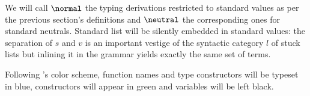 \documentclass[preprint]{sigplanconf}
\begin{document}
\begin{remark}We will call $\normal$ the typing derivations restricted to standard
values as per the previous section's definitions and $\neutral$ the corresponding
ones for standard neutrals. Standard list will be silently embedded in standard
values: the separation of $s$ and $v$ is an important vestige of the syntactic
category $l$ of stuck lists but inlining it in the grammar yields exactly the
same set of terms.
\end{remark}

\begin{remark}Following \agda{}'s color scheme, function names and type
constructors will be typeset in {\color{NavyBlue}blue}, constructors
will appear in {\color{ForestGreen}green} and variables will be left black.
\end{remark}
\end{document}
